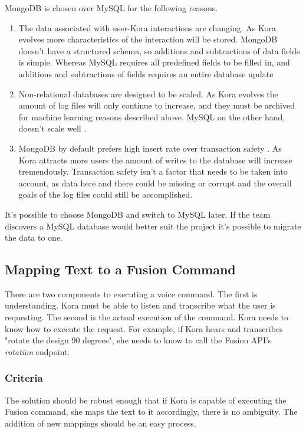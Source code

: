 \documentclass[onecolumn, draftclsnofoot,10pt, compsoc]{IEEEtran}
\begin{document}
	MongoDB is chosen over MySQL for the following reasons.
	\begin{enumerate}
		\item{
			The data associated with user-Kora interactions are changing.
			As Kora evolves more characteristics of the interaction will be stored.
			MongoDB doesn't have a structured schema, so additions and subtractions of data fields is simple.
			Whereas MySQL requires all predefined fields to be filled in, and additions and subtractions of fields requires an entire database update}
		\item{
			Non-relational databases are designed to be scaled.
			As Kora evolves the amount of log files will only continue to increase, and they must be archived for machine learning reasons described above.
			MySQL on the other hand, doesn't scale well \cite{SQLvsNoSQLsitepoint}.}
		\item{
			MongoDB by default prefers high insert rate over transaction safety \cite{SQLvsNoSQLupwork}.
			As Kora attracts more users the amount of writes to the database will increase tremendously.
			Transaction safety isn't a factor that needs to be taken into account, as data here and there could be missing or corrupt and the overall goals of the log files could still be accomplished.}
	\end{enumerate}

	It's possible to choose MongoDB and switch to MySQL later.
	If the team discovers a MySQL database would better suit the project it's possible to migrate the data to one.




	\subsection{Mapping Text to a Fusion Command}
	There are two components to executing a voice command.
	The first is understanding.
	Kora must be able to listen and transcribe what the user is requesting.
	The second is the actual execution of the command.
	Kora needs to know how to execute the request.
	For example, if Kora hears and transcribes "rotate the design 90 degrees", she needs to know to call the Fusion API's \textit{rotation} endpoint.

	\subsubsection{Criteria}
	The solution should be robust enough that if Kora is capable of executing the Fusion command, she maps the text to it accordingly, there is no ambiguity.
	The addition of new mappings should be an easy process.
\end{document}

